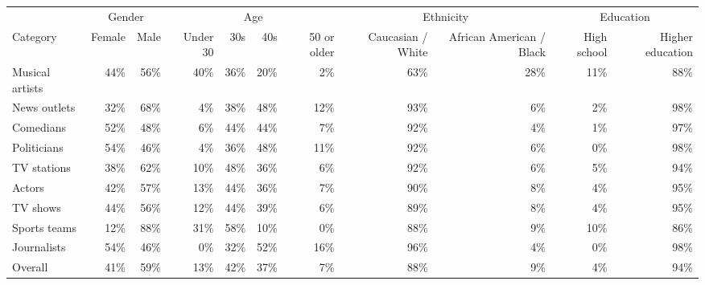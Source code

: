 \begin{tabular}{lrrrrrrrrrr}
\toprule
 & \multicolumn{2}{c}{Gender} & \multicolumn{4}{c}{Age} & \multicolumn{2}{c}{Ethnicity} & \multicolumn{2}{c}{Education} \\
Category & Female & Male & Under 30 & 30s & 40s & 50 or older & Caucasian / White & African American / Black & High school & Higher education \\
\midrule
Musical artists & 44\% & 56\% & 40\% & 36\% & 20\% & 2\% & 63\% & 28\% & 11\% & 88\% \\
News outlets & 32\% & 68\% & 4\% & 38\% & 48\% & 12\% & 93\% & 6\% & 2\% & 98\% \\
Comedians & 52\% & 48\% & 6\% & 44\% & 44\% & 7\% & 92\% & 4\% & 1\% & 97\% \\
Politicians & 54\% & 46\% & 4\% & 36\% & 48\% & 11\% & 92\% & 6\% & 0\% & 98\% \\
TV stations & 38\% & 62\% & 10\% & 48\% & 36\% & 6\% & 92\% & 6\% & 5\% & 94\% \\
Actors & 42\% & 57\% & 13\% & 44\% & 36\% & 7\% & 90\% & 8\% & 4\% & 95\% \\
TV shows & 44\% & 56\% & 12\% & 44\% & 39\% & 6\% & 89\% & 8\% & 4\% & 95\% \\
Sports teams & 12\% & 88\% & 31\% & 58\% & 10\% & 0\% & 88\% & 9\% & 10\% & 86\% \\
Journalists & 54\% & 46\% & 0\% & 32\% & 52\% & 16\% & 96\% & 4\% & 0\% & 98\% \\
\midrule
Overall & 41\% & 59\% & 13\% & 42\% & 37\% & 7\% & 88\% & 9\% & 4\% & 94\% \\
\bottomrule
\end{tabular}
